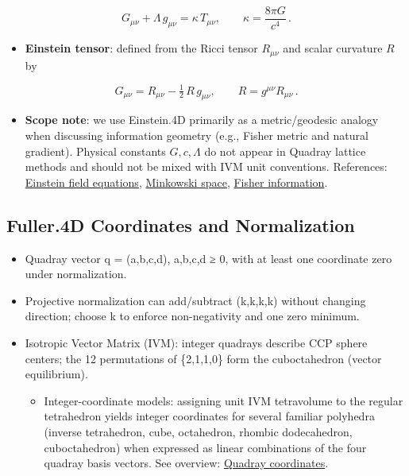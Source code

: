 \documentclass[
]{article}
\providecommand{\tightlist}{%
  \setlength{\itemsep}{0pt}\setlength{\parskip}{0pt}}
\begin{document}
\begin{equation}\label{eq:efe}
G_{\mu \nu} + \Lambda\, g_{\mu \nu} = \kappa\, T_{\mu \nu},\qquad \kappa = \frac{8\pi G}{c^4}\,.
\end{equation}

\begin{itemize}
\tightlist
\item
  \textbf{Einstein tensor}: defined from the Ricci tensor \(R_{\mu\nu}\)
  and scalar curvature \(R\) by
\end{itemize}

\begin{equation}\label{eq:einstein_tensor}
G_{\mu \nu} = R_{\mu \nu} - \tfrac{1}{2}\,R\, g_{\mu \nu},\qquad R = g^{\mu\nu} R_{\mu\nu}\,.
\end{equation}

\begin{itemize}
\tightlist
\item
  \textbf{Scope note}: we use Einstein.4D primarily as a metric/geodesic
  analogy when discussing information geometry (e.g., Fisher metric and
  natural gradient). Physical constants \(G,c,\Lambda\) do not appear in
  Quadray lattice methods and should not be mixed with IVM unit
  conventions. References:
  \href{https://en.wikipedia.org/wiki/Einstein_field_equations}{Einstein
  field equations},
  \href{https://en.wikipedia.org/wiki/Minkowski_space}{Minkowski space},
  \href{https://en.wikipedia.org/wiki/Fisher_information}{Fisher
  information}.
\end{itemize}

\hypertarget{fuller.4d-coordinates-and-normalization}{%
\subsection{Fuller.4D Coordinates and
Normalization}\label{fuller.4d-coordinates-and-normalization}}

\begin{itemize}
\tightlist
\item
  Quadray vector q = (a,b,c,d), a,b,c,d ≥ 0, with at least one
  coordinate zero under normalization.
\item
  Projective normalization can add/subtract (k,k,k,k) without changing
  direction; choose k to enforce non-negativity and one zero minimum.
\item
  Isotropic Vector Matrix (IVM): integer quadrays describe CCP sphere
  centers; the 12 permutations of \{2,1,1,0\} form the cuboctahedron
  (vector equilibrium).

  \begin{itemize}
  \tightlist
  \item
    Integer-coordinate models: assigning unit IVM tetravolume to the
    regular tetrahedron yields integer coordinates for several familiar
    polyhedra (inverse tetrahedron, cube, octahedron, rhombic
    dodecahedron, cuboctahedron) when expressed as linear combinations
    of the four quadray basis vectors. See overview:
    \href{https://en.wikipedia.org/wiki/Quadray_coordinates}{Quadray
    coordinates}.
  \end{itemize}
\end{itemize}
\end{document}
